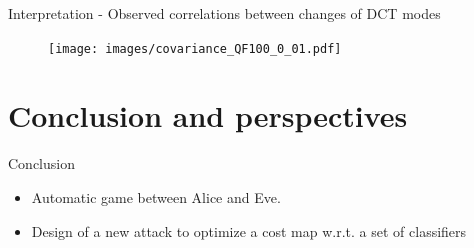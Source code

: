 \documentclass[10pt]{beamer}
\begin{document}
\begin{frame}{Interpretation - Observed correlations between changes of DCT modes}
    \begin{figure}[h]
        \texttt{[image: images/covariance\_QF100\_0\_01.pdf]}
    \end{figure}
\end{frame}


\section{Conclusion and perspectives}


\begin{frame}{Conclusion}
    \begin{itemize}
        \item Automatic game between Alice and Eve. 
        \pause
        \item Design of a new attack to optimize a cost map w.r.t. a set of classifiers

    \end{itemize}

\end{frame}
\end{document}
